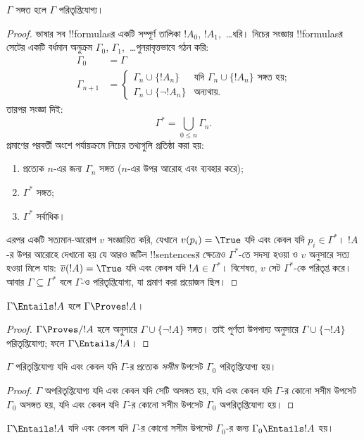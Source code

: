 \documentclass[../../../include/open-logic-section]{subfiles}
\begin{document}
\begin{thm}[পূর্ণতা]
$\Gamma$ সঙ্গত হলে $\Gamma$ পরিতৃপ্তিযোগ্য।
\end{thm}

\begin{proof}
ভাষার সব !!{formula}sর একটি সম্পূর্ণ তালিকা
$!A_0$, $!A_1$,~\dots ধরি। নিচের সংজ্ঞায় !!{formula}sর সেটের
একটি বর্ধমান অনুক্রম $\Gamma_0$, $\Gamma_1$,~\dots পুনরাবৃত্তভাবে
গঠন করি:
\begin{align*}
\Gamma_0 & = \Gamma\\
\Gamma_{n+1} &  =
\begin{cases}
  \Gamma_n \cup \{!A_n\} & \text{যদি $\Gamma_n \cup \{!A_n\}$ সঙ্গত হয়;}\\
  \Gamma_n \cup \{\lnot !A_n\} & \text{অন্যথায়}.
\end{cases}
\end{align*}
তারপর সংজ্ঞা দিই:
\[
\Gamma^* = \bigcup_{0\le n}\Gamma_n.
\]
প্রমাণের পরবর্তী অংশে পর্যায়ক্রমে নিচের তথ্যগুলি প্রতিষ্ঠা করা হয়:
\begin{enumerate}
\item প্রত্যেক $n$-এর জন্য $\Gamma_n$ সঙ্গত
  ($n$-এর উপর আরোহ এবং
   ব্যবহার করে);
\item $\Gamma^*$ সঙ্গত;
\item $\Gamma^*$ সর্বাধিক।
\end{enumerate}
এরপর একটি সত্যমান-আরোপ $v$ সংজ্ঞায়িত করি, যেখানে
$v(p_i) = \True$ যদি এবং কেবল যদি $p_i \in \Gamma^*$।
$!A$-র উপর আরোহে দেখানো হয় যে আরও জটিল !!{sentence}sর ক্ষেত্রেও
$\Gamma^*$-তে সদস্য হওয়া ও $v$ অনুসারে সত্য হওয়া মিলে যায়:
$\overline{v}(!A) = \True$ যদি এবং কেবল যদি $!A \in \Gamma^*$।
বিশেষত, $v$ সেট $\Gamma^*$-কে পরিতৃপ্ত করে। আবার
$\Gamma \subseteq \Gamma^*$ বলে $\Gamma$-ও পরিতৃপ্তিযোগ্য,
যা প্রমাণ করা প্রয়োজন ছিল।
\end{proof}

\begin{cor}
$\Gamma \Entails !A$ হলে $\Gamma \Proves !A$।
\end{cor}

\begin{proof}
$\Gamma\Proves/ !A$ হলে
 অনুসারে
$\Gamma \cup \{\lnot !A\}$ সঙ্গত।
তাই পূর্ণতা উপপাদ্য অনুসারে $\Gamma \cup \{\lnot !A\}$
পরিতৃপ্তিযোগ্য; ফলে $\Gamma \Entails/ !A$।
\end{proof}

\begin{prop}[সংহতি উপপাদ্য]
$\Gamma$ পরিতৃপ্তিযোগ্য যদি এবং কেবল যদি $\Gamma$-র প্রত্যেক
\emph{সসীম} উপসেট $\Gamma_0$ পরিতৃপ্তিযোগ্য হয়।
\end{prop}

\begin{proof}
$\Gamma$ অপরিতৃপ্তিযোগ্য যদি এবং কেবল যদি সেটি অসঙ্গত হয়,
যদি এবং কেবল যদি $\Gamma$-র কোনো সসীম উপসেট $\Gamma_0$
অসঙ্গত হয়, যদি এবং কেবল যদি $\Gamma$-র কোনো সসীম উপসেট
$\Gamma_0$ অপরিতৃপ্তিযোগ্য হয়।
\end{proof}

\begin{cor}
$\Gamma \Entails !A$ যদি এবং কেবল যদি $\Gamma$-র কোনো সসীম উপসেট
$\Gamma_0$-র জন্য $\Gamma_0 \Entails !A$ হয়।
\end{cor}
\end{document}
